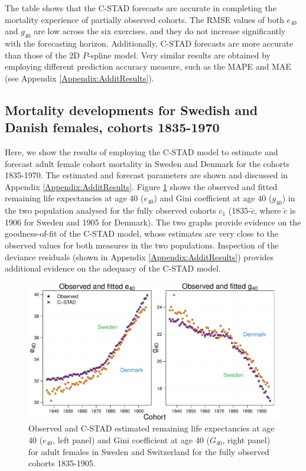 \documentclass[11pt, a4paper]{article}
\begin{document}
The table shows that the C-STAD forecasts are accurate in completing the mortality experience of partially observed cohorts. The RMSE values of both $e_{40}$ and $g_{40}$  are low across the six exercises, and they do not increase significantly with the forecasting horizon. Additionally, C-STAD forecasts are more accurate than those of the 2D $P$-spline model. Very similar results are obtained by employing different prediction accuracy measure, such as the MAPE and MAE (see Appendix \ref{Appendix:AdditResults}). \par

\subsection{Mortality developments for Swedish and Danish females, cohorts 1835-1970}
\label{Subsec:ForecastC-STAD}
Here, we show the results of employing the C-STAD model to estimate and forecast adult female cohort mortality in Sweden and Denmark for the cohorts 1835-1970. The estimated and forecast parameters are  shown and discussed in Appendix \ref{Appendix:AdditResults}. Figure \ref{Fig:CSTADfitE40G40} shows the observed and fitted remaining life expectancies at age 40 ($e_{40}$) and Gini coefficient at age 40 ($g_{40}$) in the two population analysed for the fully observed cohorts $c_1$ (1835-$\breve{c}$, where $\breve{c}$ is 1906 for Sweden and 1905 for Denmark). The two graphs provide evidence on the goodness-of-fit of the C-STAD model, whose estimates are very close to the observed values for both measures in the two populations. Inspection of the deviance residuals (shown in Appendix \ref{Appendix:AdditResults}) provides additional evidence on the adequacy of the C-STAD model. \par

\begin{figure}[t]
	\begin{center}
		\includegraphics[scale=0.57]{./Figures/F4.pdf} 
		\caption{Observed and C-STAD estimated remaining life expectancies at age 40 ($e_{40}$, left panel) and Gini coefficient at age 40 ($G_{40}$, right panel) for adult females in Sweden and Switzerland for the fully observed cohorts 1835-1905.\label{Fig:CSTADfitE40G40}}    
	\end{center}
\end{figure}
\end{document}
